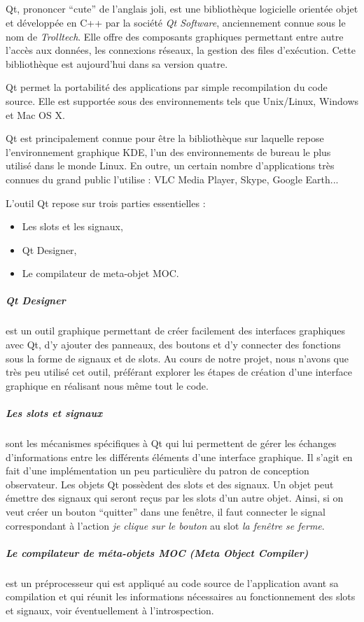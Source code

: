 \subparagraph{}
Qt, prononcer ``cute'' de l'anglais joli, est une biblioth\`eque logicielle orient\'ee objet et d\'evelopp\'ee en C++ par la soci\'et\'e \textit{Qt Software}, anciennement connue sous le nom de \textit{Trolltech}. Elle offre des composants graphiques permettant entre autre l'acc\`es aux donn\'ees, les connexions r\'eseaux, la gestion des files d'ex\'ecution. Cette biblioth\`eque est aujourd'hui dans sa version quatre.

Qt permet la portabilit\'e des applications par simple recompilation du code source. Elle est support\'ee sous des environnements tels que Unix/Linux, Windows et Mac OS X.

Qt est principalement connue pour \^etre la biblioth\`eque sur laquelle repose l'environnement graphique KDE, l'un des environnements de bureau le plus utilis\'e dans le monde Linux. En outre, un certain nombre d'applications tr\`es connues du grand public l'utilise : VLC Media Player, Skype, Google Earth...

\par
L'outil Qt repose sur trois parties essentielles : 
\begin{itemize}
	\item Les slots et les signaux,
	\item Qt Designer,
	\item Le compilateur de meta-objet MOC.
\end{itemize}

\subparagraph{Qt Designer} est un outil graphique permettant de créer facilement des interfaces graphiques avec Qt, d'y ajouter des panneaux, des boutons et d'y connecter des fonctions sous la forme de signaux et de slots. Au cours de notre projet, nous n'avons que tr\`es peu utilis\'e cet outil, pr\'ef\'erant explorer les \'etapes de cr\'eation d'une interface graphique en r\'ealisant nous m\^eme tout le code.
\subparagraph{Les slots et signaux} sont les m\'ecanismes sp\'ecifiques \`a Qt qui lui permettent de g\'erer les \'echanges d'informations entre les diff\'erents \'el\'ements d'une interface graphique. Il s'agit en fait d'une impl\'ementation un peu particulière du patron de conception observateur.
Les objets Qt poss\`edent des slots et des signaux. Un objet peut \'emettre des signaux qui seront re\c cus par les slots d'un autre objet. Ainsi, si on veut cr\'eer un bouton ``quitter'' dans une fen\^etre, il faut connecter le signal correspondant à l'action \textit{je clique sur le bouton} au slot \textit{la fen\^etre se ferme}.
\subparagraph{Le compilateur de m\'eta-objets MOC (Meta Object Compiler)} est un pr\'eprocesseur qui est appliqu\'e au code source de l'application avant sa compilation et qui r\'eunit les informations n\'ecessaires au fonctionnement des slots et signaux, voir \'eventuellement \`a l'introspection.

